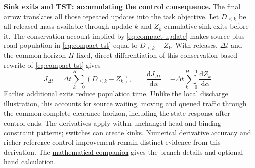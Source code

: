 \documentclass[10pt,a4paper]{article}
\newcommand{\rev}[1]{{\color{revisionred}#1}}
\begin{document}
\textbf{Sink exits and TST: accumulating the control consequence.}
The final arrow translates all those repeated updates into the task
objective. Let $D_{\leq k}$ be all released mass available through update
$k$ and $Z_k$ cumulative sink exits before it.
The \rev{conservation account implied by \eqref{eq:compact-update}} makes
source-plus-road population in \eqref{eq:compact-tst} equal to
$D_{\leq k}-Z_k$. With releases, $\Delta t$ and the common horizon $H$
fixed, \rev{direct differentiation of this conservation-based rewrite of \eqref{eq:compact-tst}} gives
\begin{equation}
 J_{\Delta t}=\Delta t\sum_{k=0}^{H-1}(D_{\leq k}-Z_k),\qquad
 \frac{\mathrm dJ_{\Delta t}}{\mathrm d\alpha}
 =-\Delta t\sum_{k=0}^{H-1}\frac{\mathrm dZ_k}{\mathrm d\alpha}.
 \label{eq:compact-objective-derivative}
\end{equation}
Earlier additional exits reduce population time. Unlike the local
discharge illustration, this accounts for source waiting, moving and
queued traffic through the common complete-clearance horizon, including
the state response after control ends.
The derivatives apply within unchanged head and binding-constraint
patterns; switches can create kinks. Numerical derivative accuracy and
richer-reference control improvement remain distinct evidence from this
derivation. The \href{urban_methodology_specification_formula_provenance.pdf}{mathematical companion}
gives the branch details and optional hand calculation.
\end{document}
